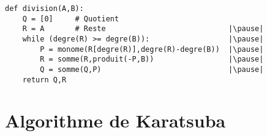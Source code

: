 \begin{frame}[fragile]

\begin{algo}[polynome.py (3)]
\begin{lstlisting}
def division(A,B):
    Q = [0]     # Quotient
    R = A       # Reste                            |\pause|
    while (degre(R) >= degre(B)):                  |\pause|
        P = monome(R[degre(R)],degre(R)-degre(B))  |\pause|
        R = somme(R,produit(-P,B))                 |\pause|
        Q = somme(Q,P)                             |\pause| 
    return Q,R
\end{lstlisting}  
\end{algo}

\end{frame}

\section{Algorithme de Karatsuba}

